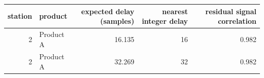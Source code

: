 \begin{tabular}{rlrrr}
\toprule
station & product & expected delay (samples) & nearest integer delay & residual signal correlation \\
\midrule
2 & Product A & 16.135 & 16 & 0.982 \\
2 & Product A & 32.269 & 32 & 0.982 \\
\bottomrule
\end{tabular}
